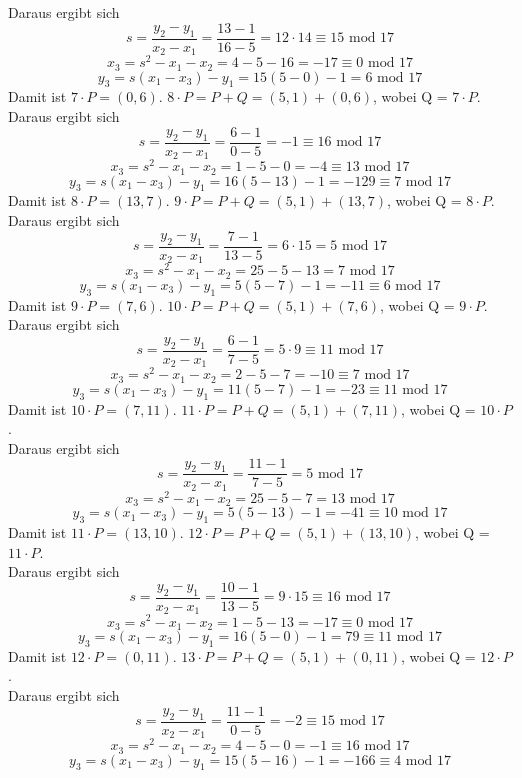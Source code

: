 Daraus ergibt sich 
$$s = \frac{y_2 - y_1}{x_2 -x_1} = \frac{13 - 1}{16 - 5} = 12 \cdot 14 \equiv 15 \text{ mod } 17$$
$$x_3 = s^2 - x_1 - x_2 = 4 - 5 - 16 = - 17 \equiv 0 \text{ mod } 17$$
$$y_3 = s(x_1 - x_3) - y_1 = 15(5 - 0) - 1 = 6 \text{ mod } 17$$
Damit ist $7 \cdot P = (0, 6)$. $8 \cdot P = P + Q = (5, 1) + (0, 6)$, wobei Q = $7 \cdot P$.\\
Daraus ergibt sich 
$$s = \frac{y_2 - y_1}{x_2 -x_1} = \frac{6 - 1}{0 - 5} = -1 \equiv 16 \text{ mod } 17$$
$$x_3 = s^2 - x_1 - x_2 = 1 - 5 - 0 = -4 \equiv 13 \text{ mod } 17$$
$$y_3 = s(x_1 - x_3) - y_1 = 16(5 - 13) - 1 = - 129 \equiv 7 \text{ mod } 17$$
Damit ist $8 \cdot P = (13, 7)$. $9 \cdot P = P + Q = (5, 1) + (13, 7)$, wobei Q = $8 \cdot P$.\\
Daraus ergibt sich 
$$s = \frac{y_2 - y_1}{x_2 -x_1} = \frac{7 - 1}{13 - 5} = 6 \cdot 15 = 5 \text{ mod } 17$$
$$x_3 = s^2 - x_1 - x_2 = 25 - 5 - 13 = 7 \text{ mod } 17$$
$$y_3 = s(x_1 - x_3) - y_1 = 5(5 - 7) - 1 = - 11 \equiv 6 \text{ mod } 17$$
Damit ist $9 \cdot P = (7, 6)$. $10 \cdot P = P + Q = (5, 1) + (7, 6)$, wobei Q = $9 \cdot P$.\\
Daraus ergibt sich 
$$s = \frac{y_2 - y_1}{x_2 -x_1} = \frac{6 - 1}{7 - 5} = 5 \cdot 9 \equiv 11 \text{ mod } 17$$
$$x_3 = s^2 - x_1 - x_2 = 2 - 5 - 7 = -10 \equiv 7 \text{ mod } 17$$
$$y_3 = s(x_1 - x_3) - y_1 = 11(5 - 7) - 1 = - 23 \equiv 11 \text{ mod } 17$$
Damit ist $10 \cdot P = (7, 11)$. $11 \cdot P = P + Q = (5, 1) + (7, 11)$, wobei Q = $10 \cdot P$.\\
Daraus ergibt sich 
$$s = \frac{y_2 - y_1}{x_2 -x_1} = \frac{11 - 1}{7 - 5} = 5 \text{ mod } 17$$
$$x_3 = s^2 - x_1 - x_2 = 25 - 5 - 7 = 13 \text{ mod } 17$$
$$y_3 = s(x_1 - x_3) - y_1 = 5(5 - 13) - 1 = - 41 \equiv 10 \text{ mod } 17$$
Damit ist $11 \cdot P = (13, 10)$. $12 \cdot P = P + Q = (5, 1) + (13, 10)$, wobei Q = $11 \cdot P$.\\
Daraus ergibt sich 
$$s = \frac{y_2 - y_1}{x_2 -x_1} = \frac{10 - 1}{13 - 5} = 9 \cdot 15 \equiv 16 \text{ mod } 17$$
$$x_3 = s^2 - x_1 - x_2 = 1 - 5 - 13 = - 17 \equiv 0 \text{ mod } 17$$
$$y_3 = s(x_1 - x_3) - y_1 = 16(5 - 0) - 1 = 79 \equiv 11 \text{ mod } 17$$
Damit ist $12 \cdot P = (0, 11)$. $13 \cdot P = P + Q = (5, 1) + (0, 11)$, wobei Q = $12 \cdot P$.\\
Daraus ergibt sich 
$$s = \frac{y_2 - y_1}{x_2 -x_1} = \frac{11 - 1}{0 - 5} = - 2 \equiv 15 \text{ mod } 17$$
$$x_3 = s^2 - x_1 - x_2 = 4 - 5 - 0 = - 1 \equiv 16 \text{ mod } 17$$
$$y_3 = s(x_1 - x_3) - y_1 = 15(5 - 16) - 1 = - 166 \equiv 4 \text{ mod } 17$$
